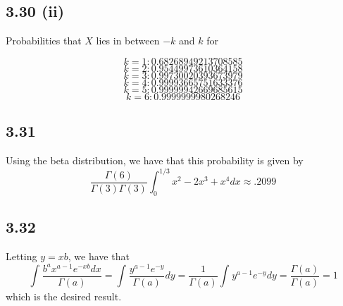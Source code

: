 \documentclass[letterpaper,12pt]{article}
\theoremstyle{definition}
\begin{document}
\subsection*{3.30 (ii)}

Probabilities that $X$ lies in between $-k$ and $k$ for 

\[ k = 1: 0.68268949213708585\]
\[ k = 2: 0.95449973610364158\]
\[ k = 3: 0.99730020393673979\]
\[ k = 4: 0.99993665751633376\]
\[ k = 5: 0.99999942669685615\]
\[ k = 6: 0.9999999980268246\]

\subsection*{3.31}
Using the beta distribution, we have that this probability is given by 
\[\frac{\Gamma(6)}{\Gamma(3)\Gamma(3)} \int^{1/3}_{0} x^2 - 2x^3 + x^4 dx \approx .2099\]


\subsection*{3.32}
Letting $y = xb$, we have that
\[ \int^{}_{} \frac{b^ax^{a-1}e^{-xb}dx}{\Gamma(a)} = 
\int^{}_{} \frac{y^{a-1}e^{-y}}{\Gamma(a)}dy = 
\frac{1}{\Gamma(a)}\int^{}_{} y^{a-1}e^{-y}dy= 
\frac{\Gamma(a)}{\Gamma(a)} = 1 \]
which is the desired result.
\end{document}
